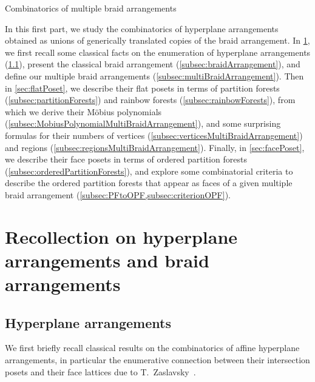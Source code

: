 \documentclass{amsart}
\makeatletter
\theoremstyle{definition}
\def\part{\@startsection{part}{1}%
\z@{.7\linespacing\@plus\linespacing}{.8\linespacing}%
{\LARGE\sffamily\centering}}
\makeatother
\begin{document}

\clearpage
\part{Combinatorics of multiple braid arrangements}
\label{part:multiBraidArrangements}

In this first part, we study the combinatorics of hyperplane arrangements obtained as unions of generically translated copies of the braid arrangement.
In \cref{sec:arrangements}, we first recall some classical facts on the enumeration of hyperplane arrangements (\cref{subsec:arrangements}), present the classical braid arrangement (\cref{subsec:braidArrangement}), and define our multiple braid arrangements (\cref{subsec:multiBraidArrangement}).
Then in \cref{sec:flatPoset}, we describe their flat posets in terms of partition forests (\cref{subsec:partitionForests}) and rainbow forests (\cref{subsec:rainbowForests}), from which we derive their M\"obius polynomials (\cref{subsec:MobiusPolynomialMultiBraidArrangement}), and some surprising formulas for their numbers of vertices (\cref{subsec:verticesMultiBraidArrangement}) and regions (\cref{subsec:regionsMultiBraidArrangement}).
Finally, in \cref{sec:facePoset}, we describe their face posets in terms of ordered partition forests (\cref{subsec:orderedPartitionForests}), and explore some combinatorial criteria to describe the ordered partition forests that appear as faces of a given multiple braid arrangement (\cref{subsec:PFtoOPF,subsec:criterionOPF}).


\section{Recollection on hyperplane arrangements and braid arrangements}
\label{sec:arrangements}


\subsection{Hyperplane arrangements}
\label{subsec:arrangements}

We first briefly recall classical results on the combinatorics of affine hyperplane arrangements, in particular the enumerative connection between their intersection posets and their face lattices due to T.~Zaslavsky~\cite{Zaslavsky}.
\end{document}
